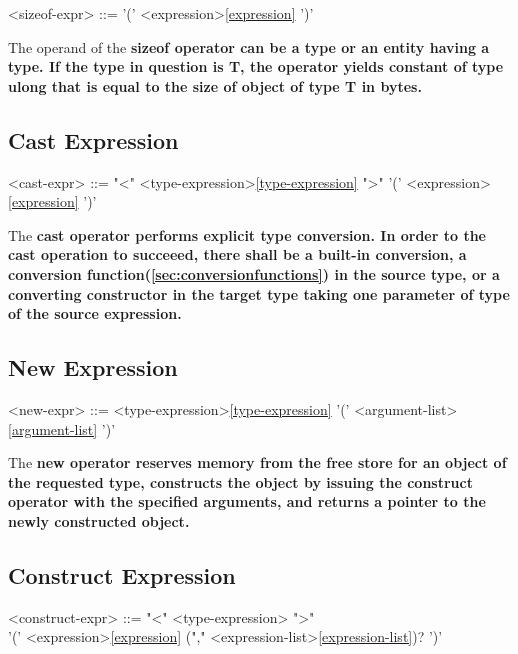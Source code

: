 \documentclass[a4paper,oneside,11pt]{article}
\begin{document}
\begin{grammar}
\label{sizeof-expr}<sizeof-expr> ::=  '(' <expression>\ref{expression} ')'
\end{grammar}

The operand of the \bf{sizeof} operator can be a type or an entity having a type.
If the type in question is T, the operator yields constant of type \bf{ulong} that is equal to the size of object of type T in bytes.

\subsection{Cast Expression}\label{sec:castexpression}

\begin{grammar}
\label{cast-expr}<cast-expr> ::=  "<" <type-expression>\ref{type-expression} ">" '(' <expression>\ref{expression} ')'
\end{grammar}

The \bf{cast} operator performs explicit type conversion.
In order to the cast operation to succeeed, there shall be a built-in conversion, a conversion function(\ref{sec:conversionfunctions}) in the source type,
or a converting constructor in the target type taking one parameter of type of the source expression.

\subsection{New Expression}

\begin{grammar}
\label{new-expr}<new-expr> ::=  <type-expression>\ref{type-expression} '(' <argument-list>\ref{argument-list} ')'
\end{grammar}

The \bf{new} operator reserves memory from the free store for an object of the requested type,
constructs the object by issuing the \bf{construct} operator with the specified arguments,
and returns a pointer to the newly constructed object.

\subsection{Construct Expression}

\begin{grammar}
\label{construct-expr}<construct-expr> ::=  "<" <type-expression> ">"\\
'(' <expression>\ref{expression} ("," <expression-list>\ref{expression-list})? ')'

\end{grammar}
\end{document}
